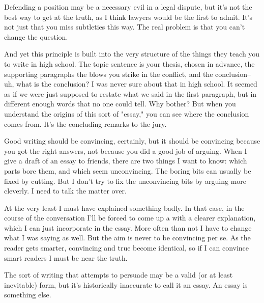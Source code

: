 Defending a
                  position may be a necessary evil in a legal dispute, but it's
                  not the best way to get at the truth, as I think lawyers would
                  be the first to admit. It's not just that you miss subtleties
                  this way. The real problem is that you can't change the
                  question.

And yet this principle is built into the
                  very structure of the things they teach you to write in high
                  school. The topic sentence is your thesis, chosen in advance,
                  the supporting paragraphs the blows you strike in the
                  conflict, and the conclusion-- uh, what is the conclusion? I
                  was never sure about that in high school. It seemed as if we
                  were just supposed to restate what we said in the first
                  paragraph, but in different enough words that no one could
                  tell. Why bother? But when you understand the origins of this
                  sort of "essay," you can see where the conclusion comes from.
                  It's the concluding remarks to the jury.

Good
                  writing should be convincing, certainly, but it should be
                  convincing because you got the right answers, not because you
                  did a good job of arguing. When I give a draft of an essay to
                  friends, there are two things I want to know: which parts bore
                  them, and which seem unconvincing. The boring bits can usually
                  be fixed by cutting. But I don't try to fix the unconvincing
                  bits by arguing more cleverly. I need to talk the matter
                  over.

At the very least I must have explained
                  something badly. In that case, in the course of the
                  conversation I'll be forced to come up a with a clearer
                  explanation, which I can just incorporate in the essay. More
                  often than not I have to change what I was saying as well. But
                  the aim is never to be convincing per se. As the reader gets
                  smarter, convincing and true become identical, so if I can
                  convince smart readers I must be near the truth.

The
                  sort of writing that attempts to persuade may be a valid (or
                  at least inevitable) form, but it's historically inaccurate to
                  call it an essay. An essay is something else.


